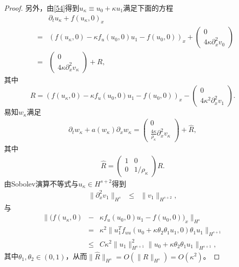 \begin{proof}
另外，由\eqref{54}得到$u_\kappa \equiv u_0 +\kappa u_1$满足下面的方程
\begin{eqnarray*}
  &&\partial_t u_\kappa + f(u_\kappa,0)_x \nonumber \\
  &=&  (f(u_\kappa,0) - \kappa f_u(u_0,0)u_1 - f(u_0,0))_x + \left( \begin{array}{c} 0 \\ 4 \kappa \partial^2_x v_0 \end{array} \right) \nonumber \\
	&=& \left( \begin{array}{c} 0 \\ 4 \kappa \partial^2_x v_\kappa \end{array} \right)   + R,
\end{eqnarray*}
其中
$$
R=(f(u_\kappa,0) - \kappa f_u(u_0,0)u_1 - f(u_0,0))_x -\left( \begin{array}{c} 0 \\ 4 \kappa^2 \partial^2_x v_1 \end{array} \right).
$$
易知$w_\kappa$满足
\begin{eqnarray}\label{580}
  \partial_t w_\kappa + a(w_\kappa) \partial_x w_\kappa = \left( \begin{array}{cc} 0 \\ \frac{4 \kappa}{\rho_\kappa} \partial^2_x v_\kappa \end{array} \right) + \hat R,
\end{eqnarray}
其中
\begin{eqnarray*}
\hat{R} = \left( \begin{array}{cc} 1 & 0 \\ 0 & 1/\rho_\kappa \end{array} \right)R .
\end{eqnarray*}
由Sobolev演算不等式\cite{majda1984compressible}与$u_\kappa \in H^{s+2}$得到
\begin{eqnarray*}
  \|\partial^2_x v_1 \|_{H^s} &\le&  \|v_1\|_{H^{s+2}},
\end{eqnarray*}
与
\begin{eqnarray*}
  \|(f(u_\kappa,0) &-& \kappa f_u(u_0,0)u_1 - f(u_0,0))_x\|_{H^s} \\
  &=& \kappa^2 \| u_1^Tf_{uu}(u_0+\kappa \theta_2 \theta_1  u_1,0) \theta_1 u_1\|_{H^{s+1}} \\
  &\le&  C \kappa^2 \|u_1\|_{H^{s+1}}^2 \|u_0+\kappa \theta_2 \theta_1  u_1\|_{H^{s+1}},
\end{eqnarray*}
其中$\theta_1,\theta_2 \in (0,1)$，从而$\|\hat{R}\|_{H^s} =O(\|R\|_{H^s})= O(\kappa^2)$。



\end{proof}
